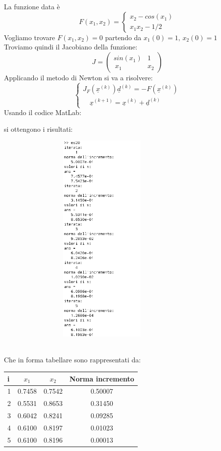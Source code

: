 \begin{flushleft}
La funzione data è \[F(x_1, x_2)= \begin{cases}x_2-cos(x_1)\\ x_1x_2 -1/2\end{cases}\]
Vogliamo trovare $F(x_1, x_2)=0$ partendo da $x_1(0) = 1\mbox{, } x_2(0) = 1$\\
Troviamo quindi il Jacobiano della funzione: 
\[ 
J=\begin{pmatrix} sin(x_1) & 1  \\\ x_1 & x_2 \end{pmatrix}
\]
Applicando il metodo di Newton si va a risolvere:
\[
\begin{cases} 
J_F(\underline{x}^{(k)})\underline{d}^{(k)}=-F(\underline{x}^{(k)}) \\ 
\quad \underline{x}^{(k+1)}=\underline{x}^{(k)}+\underline{d}^{(k)} 
\end{cases}
\]
Usando il codice MatLab:

si ottengono i risultati:
\begin{figure}[h]
\includegraphics[left, width=320px, height=400px]{cap_3/es20/es320}
\end{figure}
\newline \\
Che in forma tabellare sono rappresentati da:
\begin{center}
\begin{tabular}{|l|c|c|c|}
\hline
i & $x_1$ & $x_2$ & Norma incremento \\
\hline
1 & 0.7458 & 0.7542 & 0.50007 \\
2 & 0.5531 & 0.8653 & 0.31450 \\
3 & 0.6042 & 0.8241 & 0.09285 \\
4 & 0.6100 & 0.8197 & 0.01023 \\
5 & 0.6100 & 0.8196 & 0.00013 \\ 
\hline
\end{tabular}
\end{center}
\end{flushleft}